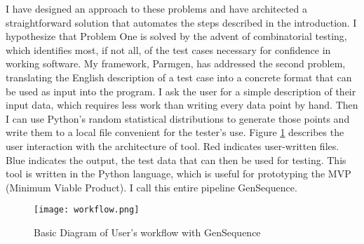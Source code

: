 I have designed an approach to these problems and have architected a straightforward solution that automates the steps described in the introduction. I hypothesize that Problem One is solved by the advent of combinatorial testing, which identifies most, if not all, of the test cases necessary for confidence in working software. My framework, Parmgen, has addressed the second problem, translating the English description of a test case into a concrete format that can be used as input into the program. I ask the user for a simple description of their input data, which requires less work than writing every data point by hand. Then I can use Python's random statistical distributions to generate those points and write them to a local file convenient for the tester's use. Figure \ref{fig:workflo} describes the user interaction with the architecture of tool. Red indicates user-written files. Blue indicates the output, the test data that can then be used for testing. This tool is written in the Python language, which is useful for prototyping the MVP (Minimum Viable Product). I call this entire pipeline GenSequence.

\begin{figure}[H]
\centering
\texttt{[image: workflow.png]}
\caption{Basic Diagram of User's workflow with GenSequence}
\label{fig:workflo}
\end{figure}